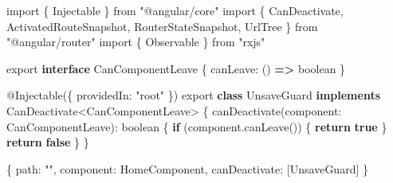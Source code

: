 \documentclass[
]{article}
\newenvironment{Shaded}{}{}
\newcommand{\ControlFlowTok}[1]{\textcolor[rgb]{0.00,0.44,0.13}{\textbf{#1}}}
\newcommand{\DataTypeTok}[1]{\textcolor[rgb]{0.56,0.13,0.00}{#1}}
\newcommand{\FunctionTok}[1]{\textcolor[rgb]{0.02,0.16,0.49}{#1}}
\newcommand{\ImportTok}[1]{#1}
\newcommand{\KeywordTok}[1]{\textcolor[rgb]{0.00,0.44,0.13}{\textbf{#1}}}
\newcommand{\NormalTok}[1]{#1}
\newcommand{\OperatorTok}[1]{\textcolor[rgb]{0.40,0.40,0.40}{#1}}
\newcommand{\StringTok}[1]{\textcolor[rgb]{0.25,0.44,0.63}{#1}}
\begin{document}
\begin{Shaded}
\begin{Highlighting}[]
\ImportTok{import}\NormalTok{ \{ Injectable \} }\ImportTok{from} \StringTok{"@angular/core"}
\ImportTok{import}\NormalTok{ \{}
\NormalTok{  CanDeactivate}\OperatorTok{,}
\NormalTok{  ActivatedRouteSnapshot}\OperatorTok{,}
\NormalTok{  RouterStateSnapshot}\OperatorTok{,}
\NormalTok{  UrlTree}
\NormalTok{\} }\ImportTok{from} \StringTok{"@angular/router"}
\ImportTok{import}\NormalTok{ \{ Observable \} }\ImportTok{from} \StringTok{"rxjs"}

\ImportTok{export} \KeywordTok{interface}\NormalTok{ CanComponentLeave \{}
  \DataTypeTok{canLeave}\OperatorTok{:}\NormalTok{ () }\KeywordTok{=\textgreater{}}\NormalTok{ boolean}
\NormalTok{\}}

\NormalTok{@}\FunctionTok{Injectable}\NormalTok{(\{}
  \DataTypeTok{providedIn}\OperatorTok{:} \StringTok{"root"}
\NormalTok{\})}
\ImportTok{export} \KeywordTok{class}\NormalTok{ UnsaveGuard }\KeywordTok{implements}\NormalTok{ CanDeactivate}\OperatorTok{\textless{}}\NormalTok{CanComponentLeave}\OperatorTok{\textgreater{}}\NormalTok{ \{}
  \FunctionTok{canDeactivate}\NormalTok{(}\DataTypeTok{component}\OperatorTok{:}\NormalTok{ CanComponentLeave)}\OperatorTok{:}\NormalTok{ boolean \{}
    \ControlFlowTok{if}\NormalTok{ (component}\OperatorTok{.}\FunctionTok{canLeave}\NormalTok{()) \{}
      \ControlFlowTok{return} \KeywordTok{true}
\NormalTok{    \}}
    \ControlFlowTok{return} \KeywordTok{false}
\NormalTok{  \}}
\NormalTok{\}}
\end{Highlighting}
\end{Shaded}

\begin{Shaded}
\begin{Highlighting}[]
\NormalTok{\{}
  \DataTypeTok{path}\OperatorTok{:} \StringTok{""}\OperatorTok{,}
  \DataTypeTok{component}\OperatorTok{:}\NormalTok{ HomeComponent}\OperatorTok{,}
  \DataTypeTok{canDeactivate}\OperatorTok{:}\NormalTok{ [UnsaveGuard]}
\NormalTok{\}}
\end{Highlighting}
\end{Shaded}
\end{document}
